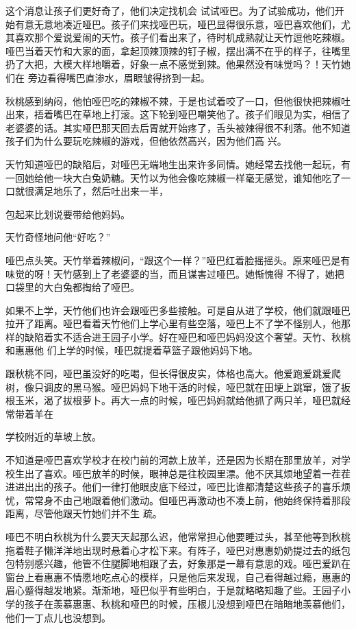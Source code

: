\documentclass{article}
\begin{document}
这个消息让孩子们更好奇了，他们决定找机会
\newpage
试试哑巴。为了试验成功，他们开始有意无意地凑近哑巴。孩子们来找哑巴玩，哑巴显得很乐意，哑巴喜欢他们，尤其喜欢那个爱说爱闹的天竹。孩子们看出来了，待时机成熟就让天竹逗他吃辣椒。哑巴当着天竹和大家的面，拿起顶辣顶辣的钉子椒，摆出满不在乎的样子，往嘴里扔了大把，大模大样地嚼着，好象一点不感觉到辣。他果然没有味觉吗？！天竹她们在
旁边看得嘴巴直渗水，眉眼皱得挤到一起。 

秋桃感到纳闷，他怕哑巴吃的辣椒不辣，于是也试着咬了一口，但他很快把辣椒吐出来，捂着嘴巴在草地上打滚。这下轮到哑巴嘲笑他了。孩子们眼见为实，相信了老婆婆的话。其实哑巴那天回去后胃就开始疼了，舌头被辣得很不利落。他不知道孩子们为什么要玩吃辣椒的游戏，但他依然高兴，因为他们高
兴。 

天竹知道哑巴的缺陷后，对哑巴无端地生出来许多同情。她经常去找他一起玩，有一回她给他一块大白兔奶糖。天竹以为他会像吃辣椒一样毫无感觉，谁知他吃了一口就很满足地乐了，然后吐出来一半，
\newpage

包起来比划说要带给他妈妈。 


天竹奇怪地问他“好吃？” 

哑巴点头笑。天竹举着辣椒问，“跟这个一样？”哑巴红着脸摇摇头。原来哑巴是有味觉的呀！天竹感到上了老婆婆的当，而且谋害过哑巴。她惭愧得
不得了，她把口袋里的大白兔都掏给了哑巴。 

如果不上学，天竹他们也许会跟哑巴多些接触。可是自从进了学校，他们就跟哑巴拉开了距离。哑巴看着天竹他们上学心里有些空落，哑巴上不了学不怪别人，他那样的缺陷着实不适合进王园子小学。好在哑巴和哑巴妈妈没这个奢望。天竹、秋桃和惠惠他
们上学的时候，哑巴就提着草篮子跟他妈妈下地。 

跟秋桃不同，哑巴虽没好的吃喝，但长得很皮实，体格也高大。他爱跑爱跳爱爬树，像只调皮的黑马猴。哑巴妈妈下地干活的时候，哑巴就在田埂上跳窜，饿了扳根玉米，渴了拔根萝卜。再大一点的时候，哑巴妈妈就给他抓了两只羊，哑巴就经常带着羊在
\newpage

学校附近的草坡上放。 

不知道是哑巴喜欢学校才在校门前的河款上放羊，还是因为长期在那里放羊，对学校生出了喜欢。哑巴放羊的时候，眼神总是往校园里漂。他不厌其烦地望着一茬茬进进出出的孩子。他们一律打他眼皮底下经过，哑巴比谁都清楚这些孩子的喜乐烦忧，常常身不由己地跟着他们激动。但哑巴再激动也不凑上前，他始终保持着那段距离，尽管他跟天竹她们并不生
疏。 

哑巴不明白秋桃为什么要天天起那么迟，他常常担心他要睡过头，甚至他等到秋桃拖着鞋子懒洋洋地出现时悬着心才松下来。有阵子，哑巴对惠惠奶奶提过去的纸包包特别感兴趣，他管不住腿脚地相跟了去，好象那是一幕有意思的戏。哑巴爱趴在窗台上看惠惠不情愿地吃点心的模样，只是他后来发现，自己看得越过瘾，惠惠的眉心蹙得越发地紧。渐渐地，哑巴似乎有些明白，于是就略略知趣了些。王园子小学的孩子在羡慕惠惠、秋桃和哑巴的时候，压根儿没想到哑巴在暗暗地羡慕他们，他们一丁点儿也没想到。
\newpage
\end{document}
